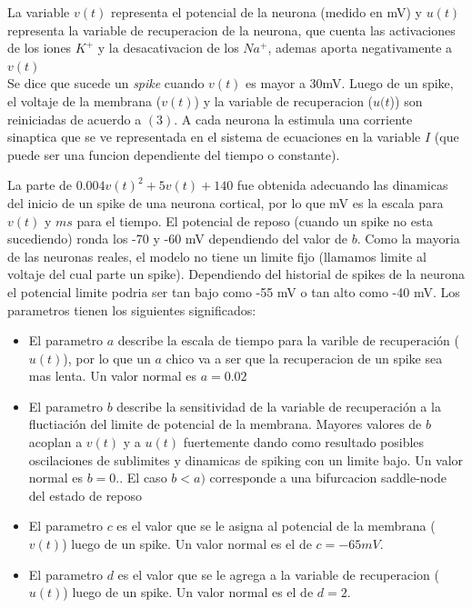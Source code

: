 \documentclass[12pt]{article}
\begin{document}
La variable $v(t)$ representa el potencial de la neurona (medido en mV) y $u(t)$ representa la variable de recuperacion de la neurona,
que cuenta las activaciones de los iones $K^{+}$ y la desacativacion de los $Na^{+}$, ademas aporta negativamente a $v(t)$ \\

Se dice que sucede un \textit{spike} cuando $v(t)$ es mayor a 30mV. Luego de un spike, el voltaje de la membrana ($v(t)$) y la variable de recuperacion ($u(t$)) son reiniciadas de acuerdo a $(3)$.
A cada neurona la estimula una corriente sinaptica que se ve representada en el sistema de ecuaciones en la variable $I$ (que puede ser una funcion dependiente del tiempo o constante).

La parte de $0.004v(t)^2 + 5v(t) + 140$ fue obtenida adecuando las dinamicas del inicio de un spike de una neurona cortical, por lo que mV es la escala para $v(t)$ y $ms$ para el tiempo.
El potencial de reposo (cuando un spike no esta sucediendo) ronda los -70 y -60 mV dependiendo del valor de $b$. Como la mayoria de las neuronas reales, el modelo no tiene un limite fijo (llamamos limite al voltaje del cual parte un spike).
Dependiendo del historial de spikes de la neurona el potencial limite podria ser tan bajo como -55 mV o tan alto como -40 mV.
Los parametros tienen los siguientes significados:
\begin{itemize}
    \item El parametro $a$ describe la escala de tiempo para la varible de recuperación ($u(t)$), por lo que un $a$ chico va a ser que la recuperacion de un spike sea mas lenta. Un valor normal es $a = 0.02$
    \item El parametro $b$ describe la sensitividad de la variable de recuperación a la fluctiación del limite de potencial de la membrana. Mayores valores de $b$ acoplan a $v(t)$ y a $u(t)$ fuertemente dando como resultado
posibles oscilaciones de sublimites y dinamicas de spiking con un limite bajo. Un valor normal es $b = 0.$. El caso $b < a)$ corresponde a una bifurcacion saddle-node del estado de reposo \cite{modeloPrimero}
    \item El parametro $c$ es el valor que se le asigna al potencial de la membrana ($v(t)$) luego de un spike. Un valor normal es el de $c = -65 mV$.
    \item El parametro $d$ es el valor que se le agrega a la variable de recuperacion ($u(t)$) luego de un spike. Un valor normal es el de $d = 2$.
\end{itemize}
\end{document}
